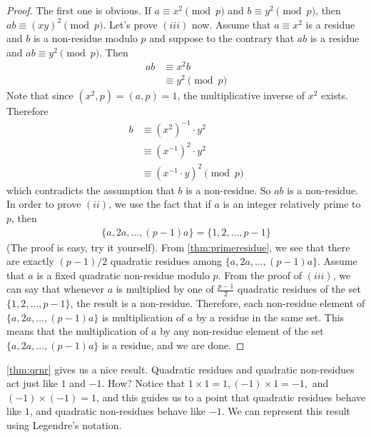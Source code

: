 \documentclass[main.tex]{subfile}
\begin{document}
	\begin{proof}
		The first one is obvious. If $a \equiv x^2 \pmod p$ and $b\equiv y^2 \pmod p$, then $ab \equiv (xy)^2 \pmod p$.
		Let's prove $(iii)$ now. Assume that $a \equiv x^2$ is a residue and $b$ is a non-residue modulo $p$ and suppose to the contrary that $ab$ is a residue and $ab \equiv y^2 \pmod p$. Then
		\begin{align*}
			ab
				& \equiv x^2b\\
				& \equiv y^2 \pmod p
		\end{align*}
		Note that since $(x^2,p)=(a,p)=1$, the multiplicative inverse of $x^2$ exists. Therefore
		\begin{align*}
			b
				& \equiv (x^2)^{-1} \cdot y^2\\
				& \equiv (x^{-1})^2 \cdot y^2\\
				& \equiv (x^{-1} \cdot y)^2 \pmod p
		\end{align*}
		which contradicts the assumption that $b$ is a non-residue. So $ab$ is a non-residue.
		In order to prove $(ii)$, we use the fact that if $a$ is an integer relatively prime to $p$, then
		\begin{align*}
			\{a,2a,\ldots,(p-1)a\} = \{ 1,2,\ldots,p-1\}
		\end{align*}
		(The proof is easy, try it yourself). From \autoref{thm:primeresidue}, we see that there are exactly   $(p-1)/2$ quadratic residues among $\{a,2a,\ldots,(p-1)a\}$. Assume that $a$ is a fixed quadratic non-residue modulo $p$. From the proof of $(iii)$, we can say that whenever $a$ is multiplied by one of $\displaystyle \frac{p-1}{2}$ quadratic residues of the set $\{ 1,2,\ldots,p-1\}$, the result is a non-residue. Therefore, each non-residue element of $\{a,2a,\ldots,(p-1)a\}$ is multiplication of $a$ by a residue in the same set. This means that the multiplication of $a$ by any non-residue element of the set $\{a,2a,\ldots,(p-1)a\}$ is a residue, and we are done.
	\end{proof}

	\autoref{thm:qrnr} gives us a nice result. Quadratic residues and quadratic non-residues act just like $1$ and $-1$. How? Notice that $1 \times 1 =1, (-1) \times 1 =-1,$ and $(-1) \times (-1)=1$, and this guides us to a point that quadratic residues behave like $1$, and quadratic non-residues behave like $-1$. %
	We can represent this result using Legendre's notation.
\end{document}
